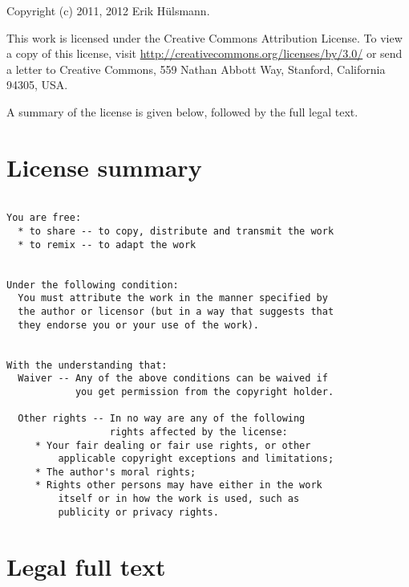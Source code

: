 Copyright (c) 2011, 2012 Erik H\"ulsmann.


This work is licensed under the Creative Commons Attribution License.
To view a copy of this license, visit \url{http://creativecommons.org/licenses/by/3.0/}
or send a letter to Creative Commons, 559 Nathan Abbott Way,
Stanford, California 94305, USA.

A summary of the license is given below, followed by the full legal text.

\section{License summary}
\label{sec-license-summary}

\begin{verbatim}

You are free:
  * to share -- to copy, distribute and transmit the work
  * to remix -- to adapt the work


Under the following condition:
  You must attribute the work in the manner specified by
  the author or licensor (but in a way that suggests that
  they endorse you or your use of the work).


With the understanding that:
  Waiver -- Any of the above conditions can be waived if
            you get permission from the copyright holder.
  
  Other rights -- In no way are any of the following
                  rights affected by the license:
     * Your fair dealing or fair use rights, or other
         applicable copyright exceptions and limitations;
     * The author's moral rights;
     * Rights other persons may have either in the work
         itself or in how the work is used, such as
         publicity or privacy rights.

\end{verbatim}



\section{Legal full text}
\label{sec-license-fulltext}

